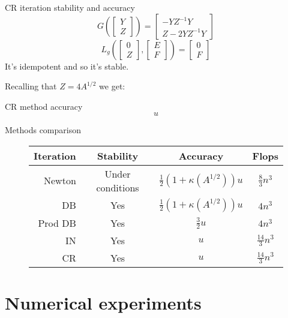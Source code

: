 \documentclass{beamer}
\theoremstyle{plain}
\theoremstyle{definition}
\theoremstyle{remark}
\newcommand{\pa}[1]{\left(#1\right)}
\newcommand{\bra}[1]{\left[#1\right]}
\begin{document}
\begin{frame}{CR iteration stability and accuracy}
  \[ G\pa{\bra{\begin{matrix}Y\\Z\end{matrix}}} = \bra{
      \begin{matrix}
        -YZ^{-1}Y  \\
        Z-2YZ^{-1}Y
      \end{matrix}} \]
  \[ L_g\pa{ \bra{ \begin{matrix}0\\Z\end{matrix}},
      \bra{\begin{matrix}E\\F\end{matrix}}} = \bra{\begin{matrix}0\\
        F \end{matrix}} \]
  It's idempotent and so it's stable. \vfill
  
  Recalling that $Z = 4A^{1/2}$ we get:
  \begin{block}{CR method accuracy}
    \[ u \]
  \end{block}
\end{frame}

\begin{frame}{Methods comparison}
  \begin{figure}
    \begin{tabular}{ r | c c >{\small}c }
      Iteration & Stability & Accuracy & Flops \\
      \hline
      Newton & Under conditions & $\frac{1}{2}\pa{1+ \kappa\pa{A^{1/2}}}u$ & $\frac{8}{3}n^3$ \\
      DB & Yes & $\frac{1}{2}\pa{1+ \kappa\pa{A^{1/2}}}u$ & $4n^3$ \\
      Prod DB & Yes & $\frac{3}{2}u$ & $4n^3$ \\
      IN & Yes & $u$ & $\frac{14}{3}n^3$ \\
      CR & Yes & $u$ & $\frac{14}{3}n^3$
    \end{tabular}
  \end{figure}
\end{frame}

\section{Numerical experiments}
\end{document}
